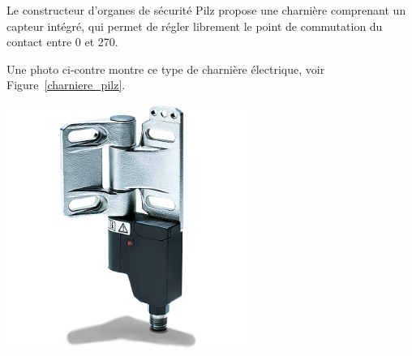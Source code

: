 \begin{minipage}[c]{0.6\textwidth}
    Le constructeur d'organes de sécurité Pilz propose une charnière comprenant un capteur intégré, qui permet de régler librement le point de commutation du contact entre 0\textdegree{} et 270\textdegree{}.

    Une photo ci-contre montre ce type de charnière électrique, voir Figure~\ref{charniere_pilz}.
\end{minipage}\hfill
\begin{minipage}[c]{0.35\textwidth}
    \begin{center}
        \includegraphics[width=0.6\textwidth]{assets/figures/Protections_laser/Securite_electrique/charniere_pilz.png}
    \end{center}
    \label{charniere_pilz}
\end{minipage}

